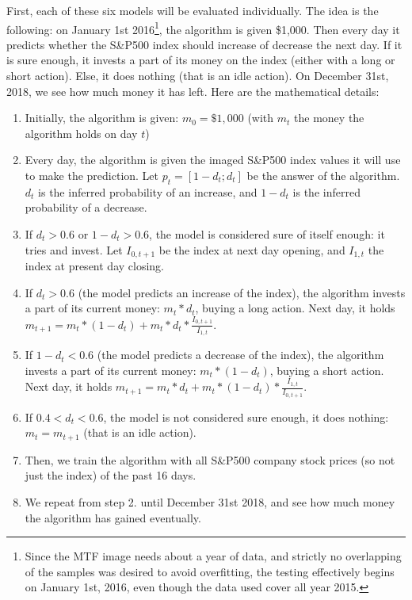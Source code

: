 \documentclass[11pt]{article}
\begin{document}
\begin{onehalfspace}
First, each of these six models will be evaluated individually. The idea is the following: on January 1st 2016\footnote{Since the MTF image needs about a year of data, and strictly no overlapping of the samples was desired to avoid overfitting, the testing effectively begins on January 1st, 2016, even though the data used cover all year 2015.}, the algorithm is given \$1,000. Then every day it predicts whether the S\&P500 index should increase of decrease the next day. If it is sure enough, it invests a part of its money on the index (either with a long or short action). Else, it does nothing (that is an idle action). On December 31st, 2018, we see how much money it has left. Here are the mathematical details: 

\begin{enumerate}
    \item Initially, the algorithm is given: $m_0 = \$1,000$ (with $m_t$ the money the algorithm holds on day $t$)
    \item Every day, the algorithm is given the imaged S\&P500 index values it will use to make the prediction. Let $p_t = [1 - d_t;d_t]$ be the answer of the algorithm. $d_t$ is the inferred probability of an increase, and $1-d_t$ is the inferred probability of a decrease.
    \item If $d_t > 0.6$ or $1 - d_t > 0.6$, the model is considered sure of itself enough: it tries and invest. Let $I_{0,t+1}$ be the index at next day opening, and $I_{1,t}$ the index at present day closing.
    \item If $d_t > 0.6$ (the model predicts an increase of the index), the algorithm invests a part of its current money: $m_t * d_t$, buying a long action. Next day, it holds $m_{t+1} = m_t * (1-d_t) + m_t * d_t * \frac{I_{0,t+1}}{I_{1,t}}$.    
    \item If $1 - d_t < 0.6$ (the model predicts a decrease of the index), the algorithm invests a part of its current money: $m_t * (1- d_t)$, buying a short action. Next day, it holds $m_{t+1} = m_t * d_t + m_t * (1 - d_t) * \frac{I_{1,t}}{I_{0,t+1}}$.
    \item If $0.4 < d_t < 0.6$, the model is not considered sure enough, it does nothing: $m_t = m_{t+1}$ (that is an idle action).
    \item Then, we train the algorithm with all S\&P500 company stock prices (so not just the index) of the past 16 days. 
    \item We repeat from step 2. until December 31st 2018, and see how much money the algorithm has gained eventually.
\end{enumerate}


\end{onehalfspace}
\end{document}

